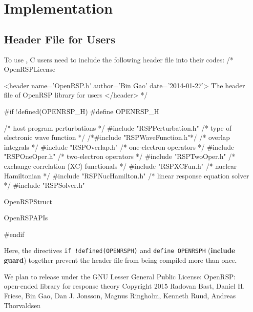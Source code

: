 \chapter{Implementation}
\label{chapter-implementation}

\section{Header File for Users}

To use \LibName, C users need to include the following header file into
their codes:
\nwenddocs{}\endmoddef
/*
  \LA{}OpenRSPLicense~{\nwtagstyle{}}\RA{}

  <header name='OpenRSP.h' author='Bin Gao' date='2014-01-27'>
    The header file of OpenRSP library for users
  </header>
*/

#if !defined(OPENRSP_H)
#define OPENRSP_H

/* host program perturbations */
#include "RSPPerturbation.h"
/* type of electronic wave function */
/*#include "RSPWaveFunction.h"*/
/* overlap integrals */
#include "RSPOverlap.h"
/* one-electron operators */
#include "RSPOneOper.h"
/* two-electron operators */
#include "RSPTwoOper.h"
/* exchange-correlation (XC) functionals */
#include "RSPXCFun.h"
/* nuclear Hamiltonian */
#include "RSPNucHamilton.h"
/* linear response equation solver */
#include "RSPSolver.h"

\LA{}OpenRSPStruct~{\nwtagstyle{}}\RA{}

\LA{}OpenRSPAPIs~{\nwtagstyle{}}\RA{}

#endif

\nwendcode{}Here, the directives {\tt{}{}if\ !defined(OPENRSP{}H)} and {\tt{}{}define\ OPENRSP{}H}
(\textbf{include guard}) together prevent the header file
from being compiled more than once.

We plan to release \LibName under the GNU Lesser General Public
License:
\nwenddocs{}\endmoddef
OpenRSP: open-ended library for response theory
Copyright 2015 Radovan Bast,
               Daniel H. Friese,
               Bin Gao,
               Dan J. Jonsson,
               Magnus Ringholm,
               Kenneth Ruud,
               Andreas Thorvaldsen

